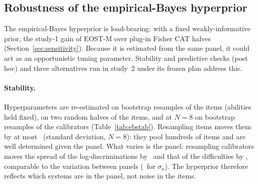 \subsection{Robustness of the empirical-Bayes hyperprior}\label{sec:eb}
The empirical-Bayes hyperprior is load-bearing: with a fixed weakly-informative prior,
the study-1 gain of EOST-M over plug-in Fisher CAT halves (Section~\ref{sec:sensitivity}).
Because it is estimated from the same panel, it could act as an opportunistic tuning
parameter. Stability and predictive checks (post hoc) and three alternatives run in study~2
under its frozen plan address this.

\paragraph{Stability.} Hyperparameters are re-estimated on bootstrap resamples of the items
(abilities held fixed), on two random halves of the items, and at $N=8$ on bootstrap
resamples of the calibrators (Table~\ref{tab:ebstab}). Resampling items moves them by at most
\EBItemsSdMaxEight\ (standard deviation, $N=8$): they pool hundreds of items and are well
determined given the panel. What varies is the panel: resampling calibrators moves the
spread of the log-discriminations by \EBCalSdSigmaA\ and that of the difficulties by
\EBCalSdSigmaB, comparable to the variation between panels (\EBBetweenSigmaA\ for
$\sigma_a$). The hyperprior therefore reflects which systems are in the panel, not noise
in the items.



